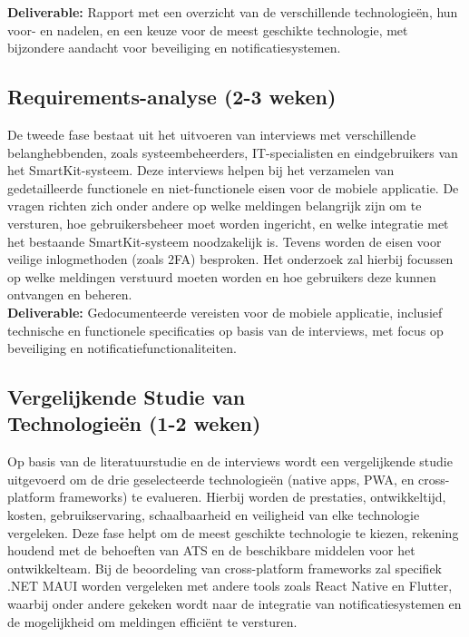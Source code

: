 \noindent \textbf{Deliverable:} Rapport met een overzicht van de verschillende technologieën, hun voor- en nadelen, en een keuze voor de meest geschikte technologie, met bijzondere aandacht voor beveiliging en notificatiesystemen.

\subsection{Requirements-analyse (2-3 weken)}
\noindent De tweede fase bestaat uit het uitvoeren van interviews met verschillende belanghebbenden, zoals systeembeheerders, IT-specialisten en eindgebruikers van het SmartKit-systeem. Deze interviews helpen bij het verzamelen van gedetailleerde functionele en niet-functionele eisen voor de mobiele applicatie. De vragen richten zich onder andere op welke meldingen belangrijk zijn om te versturen, hoe gebruikersbeheer moet worden ingericht, en welke integratie met het bestaande SmartKit-systeem noodzakelijk is. Tevens worden de eisen voor veilige inlogmethoden (zoals 2FA) besproken. Het onderzoek zal hierbij focussen op welke meldingen verstuurd moeten worden en hoe gebruikers deze kunnen ontvangen en beheren. \\

\noindent \textbf{Deliverable:} Gedocumenteerde vereisten voor de mobiele applicatie, inclusief technische en functionele specificaties op basis van de interviews, met focus op beveiliging en notificatiefunctionaliteiten.

\subsection{Vergelijkende Studie van \\Technologieën (1-2 weken)}
\noindent Op basis van de literatuurstudie en de interviews wordt een vergelijkende studie uitgevoerd om de drie geselecteerde technologieën (native apps, PWA, en cross-platform frameworks) te evalueren. Hierbij worden de prestaties, ontwikkeltijd, kosten, gebruikservaring, schaalbaarheid en veiligheid van elke technologie vergeleken. Deze fase helpt om de meest geschikte technologie te kiezen, rekening houdend met de behoeften van ATS en de beschikbare middelen voor het ontwikkelteam. Bij de beoordeling van cross-platform frameworks zal specifiek .NET MAUI worden vergeleken met andere tools zoals React Native en Flutter, waarbij onder andere gekeken wordt naar de integratie van notificatiesystemen en de mogelijkheid om meldingen efficiënt te versturen. \\

